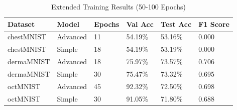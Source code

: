 \begin{table}[H]
\centering
\caption{Extended Training Results (50-100 Epochs)}
\begin{tabular}{@{}llllll@{}}
\toprule
\textbf{Dataset} & \textbf{Model} & \textbf{Epochs} & \textbf{Val Acc} & \textbf{Test Acc} & \textbf{F1 Score} \\ \midrule
chestMNIST & Advanced & 11 & 54.19\% & 53.16\% & 0.000 \\
chestMNIST & Simple & 18 & 54.19\% & 53.19\% & 0.000 \\
dermaMNIST & Advanced & 18 & 75.97\% & 73.57\% & 0.706 \\
dermaMNIST & Simple & 30 & 75.47\% & 73.32\% & 0.695 \\
octMNIST & Advanced & 45 & 92.32\% & 72.50\% & 0.698 \\
octMNIST & Simple & 30 & 91.05\% & 71.80\% & 0.688 \\
\bottomrule
\end{tabular}
\end{table}


